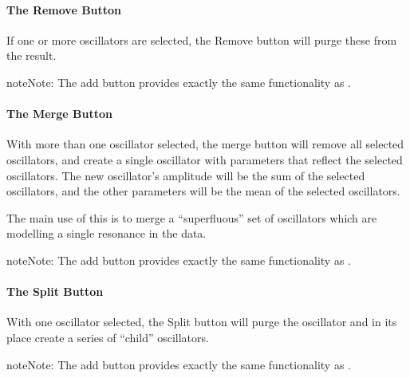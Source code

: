 \documentclass[letterpaper,10pt,english]{sphinxmanual}
\begin{document}
\paragraph{The Remove Button}
\label{\detokenize{gui/usage/result:the-remove-button}}
\sphinxAtStartPar
If one or more oscillators are selected, the Remove button will purge these
from the result.

\begin{sphinxadmonition}{note}{Note:}
\sphinxAtStartPar
The add button provides exactly the same functionality as
{\hyperref[\detokenize{references/core:nmrespy.core.Estimator.remove_oscillators}]{}}.
\end{sphinxadmonition}


\paragraph{The Merge Button}
\label{\detokenize{gui/usage/result:the-merge-button}}
\sphinxAtStartPar
With more than one oscillator selected, the merge button will remove all
selected oscillators, and create a single oscillator with parameters that
reflect the selected oscillators. The new oscillator’s amplitude will be
the sum of the selected oscillators, and the other parameters will be the
mean of the selected oscillators.

\sphinxAtStartPar
The main use of this is to merge a “superfluous” set of oscillators which
are modelling a single resonance in the data.

\begin{sphinxadmonition}{note}{Note:}
\sphinxAtStartPar
The add button provides exactly the same functionality as
{\hyperref[\detokenize{references/core:nmrespy.core.Estimator.merge_oscillators}]{}}.
\end{sphinxadmonition}


\paragraph{The Split Button}
\label{\detokenize{gui/usage/result:the-split-button}}
\sphinxAtStartPar
With one oscillator selected, the Split button will purge the oscillator
and in its place create a series of “child” oscillators.

\begin{sphinxadmonition}{note}{Note:}
\sphinxAtStartPar
The add button provides exactly the same functionality as
{\hyperref[\detokenize{references/core:nmrespy.core.Estimator.split_oscillator}]{}}.
\end{sphinxadmonition}
\end{document}
